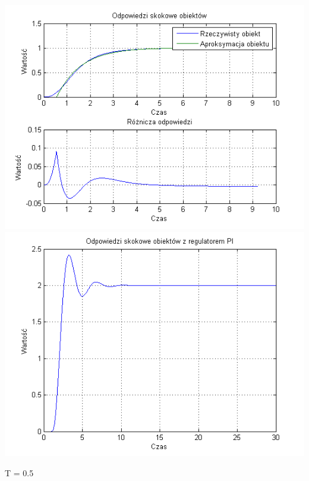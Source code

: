 \documentclass[10pt,a4paper]{article}
\begin{document}
\begin{center}
\includegraphics[scale=1]{images/jeden/skrypt_253.png}\\
\includegraphics[scale=1]{images/jeden/skrypt_254.png}\\
\end{center}
\newpage
T = 0.5
\end{document}
